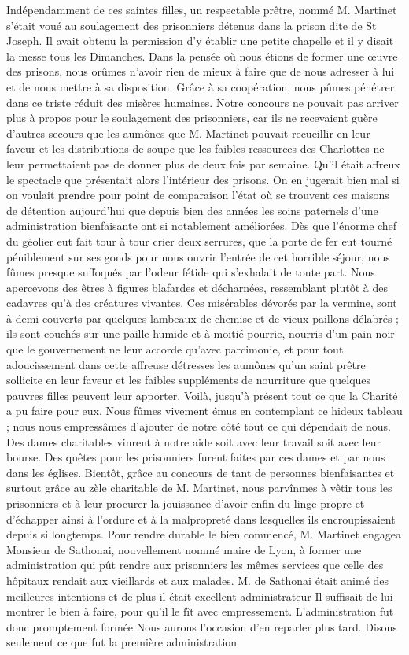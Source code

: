 \documentclass[11pt,a4paper]{report}
\begin{document}
Indépendamment de ces saintes filles, un respectable prêtre, nommé M. Martinet s'était voué au soulagement des prisonniers détenus dans la prison dite de St Joseph. Il avait obtenu la permission d'y établir une petite chapelle et il y disait la messe tous les Dimanches. Dans la pensée où nous étions de former une œuvre des prisons, nous orûmes n'avoir rien de mieux à faire que de nous adresser à lui et de nous mettre à sa disposition. Grâce à sa coopération, nous pûmes pénétrer dans ce triste réduit des misères humaines. Notre concours ne pouvait pas arriver plus à propos pour le soulagement des prisonniers, car ils ne recevaient guère d'autres secours que les aumônes que M. Martinet pouvait recueillir en leur faveur et les distributions de soupe que les faibles ressources des Charlottes ne leur permettaient pas de donner plus de deux fois par semaine. Qu'il était affreux le spectacle que présentait alors l'intérieur des prisons. On en jugerait bien mal si on voulait prendre pour point de comparaison l'état où se trouvent ces maisons de détention aujourd'hui que depuis bien des années les soins paternels d'une administration bienfaisante ont si notablement améliorées. Dès que l'énorme chef du géolier eut fait tour à tour crier deux serrures, que la porte de fer eut tourné péniblement sur ses gonds pour nous ouvrir l'entrée de cet horrible séjour, nous fûmes presque suffoqués par l'odeur fétide qui s'exhalait de toute part. Nous apercevons des êtres à figures blafardes et décharnées, ressemblant plutôt à des cadavres qu'à des créatures vivantes. Ces misérables dévorés par la vermine, sont à demi couverts par quelques lambeaux de chemise et de vieux paillons délabrés ; ils sont couchés sur une paille humide et à moitié pourrie, nourris d'un pain noir que le gouvernement ne leur accorde qu'avec parcimonie, et pour tout adoucissement dans cette affreuse détresses les aumônes qu'un saint prêtre sollicite en leur faveur et les faibles suppléments de nourriture que quelques pauvres filles peuvent leur apporter. Voilà, jusqu'à présent tout ce que la Charité a pu faire pour eux. Nous fûmes vivement émus en contemplant ce hideux tableau ; nous nous empressâmes d'ajouter de notre côté tout ce qui dépendait de nous. Des dames charitables vinrent à notre aide soit avec leur travail soit avec leur bourse. Des quêtes pour les prisonniers furent faites par ces dames et par nous dans les églises. Bientôt, grâce au concours de tant de personnes bienfaisantes et surtout grâce au zèle charitable de M. Martinet, nous parvînmes à vêtir tous les prisonniers et à leur procurer la jouissance d'avoir enfin du linge propre et d'échapper ainsi à l'ordure et à la malpropreté dans lesquelles ils encroupissaient depuis si longtemps. Pour rendre durable le bien commencé, M. Martinet engagea Monsieur de Sathonai, nouvellement nommé maire de Lyon, à former une administration qui pût rendre aux prisonniers les mêmes services que celle des hôpitaux rendait aux vieillards et aux malades. M. de Sathonai était animé des meilleures intentions et de plus il était excellent administrateur Il suffisait de lui montrer le bien à faire, pour qu'il le fît avec empressement. L'administration fut donc promptement formée Nous aurons l'occasion d'en reparler plus tard. Disons seulement ce que fut la première administration 
\end{document}
